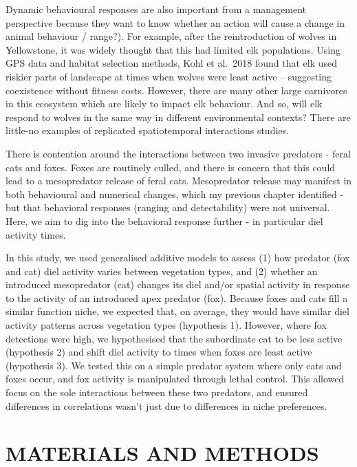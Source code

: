 \documentclass[]{elsarticle} %
\begin{document}
Dynamic behavioural responses are also important from a management perspective because they want to know whether an action will cause a change in animal behaviour / range?). For example, after the reintroduction of wolves in Yellowstone, it was widely thought that this had limited elk populations. Using GPS data and habitat selection methods, Kohl et al.~2018 found that elk used riskier parts of landscape at times when wolves were least active -- suggesting coexistence without fitness costs. However, there are many other large carnivores in this ecosystem which are likely to impact elk behaviour. And so, will elk respond to wolves in the same way in different environmental contexts? There are little-no examples of replicated spatiotemporal interactions studies.

There is contention around the interactions between two invasive predators - feral cats and foxes. Foxes are routinely culled, and there is concern that this could lead to a mesopredator release of feral cats. Mesopredator release may manifest in both behavioural and numerical changes, which my previous chapter identified - but that behavioral responses (ranging and detectability) were not universal. Here, we aim to dig into the behavioral response further - in particular diel activity times.

In this study, we used generalised additive models to assess (1) how predator (fox and cat) diel activity varies between vegetation types, and (2) whether an introduced mesopredator (cat) changes its diel and/or spatial activity in response to the activity of an introduced apex predator (fox). Because foxes and cats fill a similar function niche, we expected that, on average, they would have similar diel activity patterns across vegetation types (hypothesis 1). However, where fox detections were high, we hypothesised that the subordinate cat to be less active (hypothesis 2) and shift diel activity to times when foxes are least active (hypothesis 3). We tested this on a simple predator system where only cats and foxes occur, and fox activity is manipulated through lethal control. This allowed focus on the sole interactions between these two predators, and ensured differences in correlations wasn't just due to differences in niche preferences.

\newpage

\hypertarget{materials-and-methods}{%
\section{MATERIALS AND METHODS}\label{materials-and-methods}}
\end{document}

